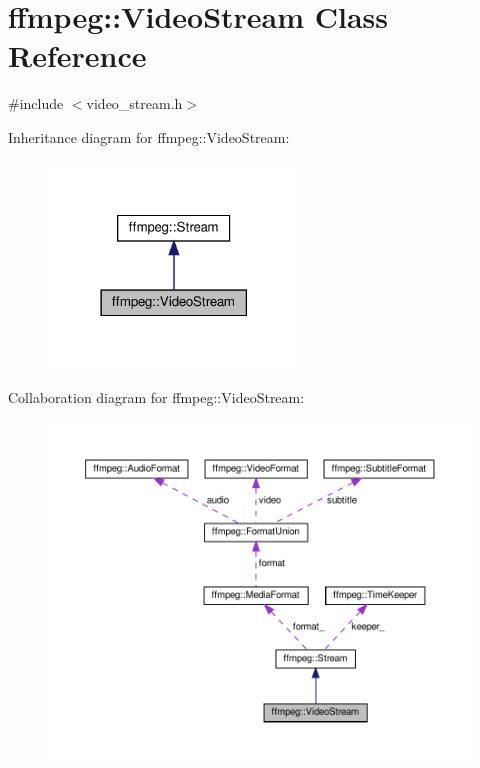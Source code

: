 \hypertarget{classffmpeg_1_1VideoStream}{}\section{ffmpeg\+:\+:Video\+Stream Class Reference}
\label{classffmpeg_1_1VideoStream}


{\ttfamily \#include $<$video\+\_\+stream.\+h$>$}



Inheritance diagram for ffmpeg\+:\+:Video\+Stream\+:
\nopagebreak
\begin{figure}[H]
\begin{center}
\leavevmode
\includegraphics[width=189pt]{classffmpeg_1_1VideoStream__inherit__graph}
\end{center}
\end{figure}


Collaboration diagram for ffmpeg\+:\+:Video\+Stream\+:
\nopagebreak
\begin{figure}[H]
\begin{center}
\leavevmode
\includegraphics[width=350pt]{classffmpeg_1_1VideoStream__coll__graph}
\end{center}
\end{figure}
